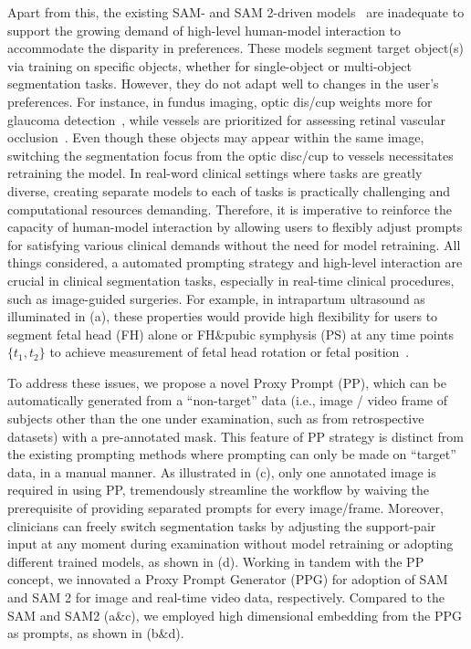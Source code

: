 Apart from this, the existing SAM- and SAM 2-driven models~\cite{shaharabany2023autosam, zhang2023customized, wu2023self} are inadequate to support the growing demand of high-level human-model interaction to accommodate the  disparity in preferences. These models segment target object(s) via training on specific objects, whether for single-object or multi-object segmentation tasks. However, they do not adapt well to changes in the user’s preferences. For instance, in fundus imaging, optic dis/cup weights more for glaucoma detection~\cite{thakur2018survey}, while vessels are prioritized for assessing retinal vascular occlusion~\cite{sekhar2008automated}. Even though these objects may appear within the same image, switching the segmentation focus from the optic disc/cup to vessels necessitates retraining the model. In real-word clinical settings where tasks are greatly diverse, creating separate models to each of tasks is practically challenging and computational resources demanding. Therefore, it is imperative to reinforce the capacity of human-model interaction by allowing users to flexibly adjust prompts for satisfying various clinical demands without the need for model retraining. All things considered, a automated prompting strategy and high-level interaction are crucial in clinical segmentation tasks, especially in real-time clinical procedures, such as image-guided surgeries. For example, in intrapartum ultrasound as illuminated in (a), these properties would provide high flexibility for users to segment fetal head (FH) alone or FH\&pubic symphysis (PS) at any time points \(\{t_{1}, t_{2}\}\) to achieve measurement of fetal head rotation or fetal position~\cite{ghi2018isuog}.

To address these issues, we propose a novel Proxy Prompt (PP), which can be automatically generated from a ``non-target'' data (i.e., image / video frame of subjects other than the one under examination, such as from retrospective datasets) with a pre-annotated mask. This feature of PP strategy is distinct from the existing prompting methods where prompting can only be made on ``target'' data, in a manual manner. As illustrated in (c), only one annotated image is required in using PP, tremendously streamline the workflow by waiving the prerequisite of providing separated prompts for every image/frame. Moreover, clinicians can freely switch segmentation tasks by adjusting the support-pair input at any moment during examination without model retraining or adopting different trained models, as shown in (d). 
Working in tandem with the PP concept, we innovated a Proxy Prompt Generator (PPG) for adoption of SAM and SAM 2 for image and real-time video data, respectively. Compared to the SAM and SAM2 (a\&c), we employed high dimensional embedding from the PPG as prompts, as shown in (b\&d).


